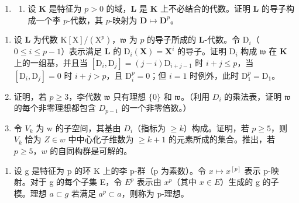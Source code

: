 \begin{enumerate}
\def\labelenumi{\arabic{enumi}.}
\setcounter{enumi}{20}
\tightlist
\item
  \begin{enumerate}
  \def\labelenumii{(\alph{enumii})}
  \tightlist
  \item
    设 \(\mathbf{K}\) 是特征为 \(p > 0\) 的域，\(\mathbf{L}\) 是 \(\mathbf{K}\) 上不必结合的代数。证明 \(\mathbf{L}\) 的导子构成一个李 \(p\)-代数，其 \(p\)-映射为 \(\mathbf{D} \mapsto \mathbf{D}^p\)。
  \end{enumerate}
\end{enumerate}

\begin{enumerate}
\def\labelenumi{(\alph{enumi})}
\setcounter{enumi}{1}
\item
  设 \(\mathbf{L}\) 为代数 \(\mathrm{K}[\mathrm{X}] / (\mathrm{X}^p)\)，\(\mathfrak{w}\) 为 \(p\) 的导子所成的 \(\mathbf{L}\)-代数。令 \(\mathrm{D}_i\)（\(0 \leqslant i \leqslant p - 1\)）表示满足 \(\mathbf{L}\) 的 \(\mathrm{D}_i(\mathbf{X}) = \mathbf{X}^i\) 的导子。证明 \(\mathrm{D}_i\) 构成 \(\mathfrak{w}\) 在 \(\mathbf{K}\) 上的一组基，并且当 \([\mathrm{D}_i, \mathrm{D}_j] = (j - i)\mathrm{D}_{i + j - 1}\) 时 \(i + j \leqslant p\)，当 \([\mathrm{D}_i, \mathrm{D}_j] = 0\) 时 \(i + j > p\)，且 \(\mathrm{D}_i^p = 0\)；但 \(i = 1\) 时例外，此时 \(\mathrm{D}_1^p = \mathrm{D}_1\)。
\item
  证明，若 \(p \geqslant 3\)，李代数 \(\mathfrak{w}\) 只有理想 \(\{0\}\) 和 \(\mathfrak{w}\)。（利用 \(D_i\) 的乘法表，证明 \(\mathfrak{w}\) 的每个非零理想都包含 \(D_{p-1}\) 的一个非零倍数。）
\item
令 \(V_{k}\) 为 w 的子空间，其基由 \(D_{i}\)（指标为 \(\geqslant k\)）构成。证明，若 \(p \geqslant 5\)，则 \(V_k\) 恰为 \(Z \in w\) 中中心化子维数为 \(\geqslant k + 1\) 的元素所成的集合。推出，若 \(p \geqslant 5\)，\(w\) 的自同构群是可解的。
\end{enumerate}

\begin{enumerate}
\def\labelenumi{\arabic{enumi}.}
\setcounter{enumi}{21}
\tightlist
\item
  设 g 是特征为 p 的环 K 上的李 p-群（p 为素数）。令 \(x \mapsto x^{[p]}\) 表示 p-映射。对于 g 的每个子集 E，令 \(E^{p}\) 表示由 \(x^{p}\)（其中 \(x \in E\)）生成的 g 的子模。理想 \(a \subset g\) 若满足 \(a^{p} \subset a\)，则称为 p-理想。
\end{enumerate}

